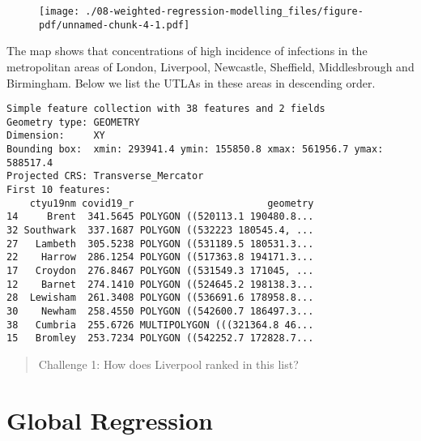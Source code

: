 \documentclass[
  letterpaper,
  krantz2]{style/krantz}
\newenvironment{Shaded}{\begin{snugshade}}{\end{snugshade}}
\newcommand{\DecValTok}[1]{\textcolor[rgb]{0.68,0.00,0.00}{#1}}
\newcommand{\FunctionTok}[1]{\textcolor[rgb]{0.28,0.35,0.67}{#1}}
\newcommand{\NormalTok}[1]{\textcolor[rgb]{0.00,0.23,0.31}{#1}}
\newcommand{\OtherTok}[1]{\textcolor[rgb]{0.00,0.23,0.31}{#1}}
\newcommand{\SpecialCharTok}[1]{\textcolor[rgb]{0.37,0.37,0.37}{#1}}
\begin{document}
\begin{figure}[H]

{\centering \texttt{[image: ./08-weighted-regression-modelling\_files/figure-pdf/unnamed-chunk-4-1.pdf]}

}

\end{figure}

The map shows that concentrations of high incidence of infections in the
metropolitan areas of London, Liverpool, Newcastle, Sheffield,
Middlesbrough and Birmingham. Below we list the UTLAs in these areas in
descending order.

\begin{Shaded}
\end{Shaded}

\begin{verbatim}
Simple feature collection with 38 features and 2 fields
Geometry type: GEOMETRY
Dimension:     XY
Bounding box:  xmin: 293941.4 ymin: 155850.8 xmax: 561956.7 ymax: 588517.4
Projected CRS: Transverse_Mercator
First 10 features:
    ctyu19nm covid19_r                       geometry
14     Brent  341.5645 POLYGON ((520113.1 190480.8...
32 Southwark  337.1687 POLYGON ((532223 180545.4, ...
27   Lambeth  305.5238 POLYGON ((531189.5 180531.3...
22    Harrow  286.1254 POLYGON ((517363.8 194171.3...
17   Croydon  276.8467 POLYGON ((531549.3 171045, ...
12    Barnet  274.1410 POLYGON ((524645.2 198138.3...
28  Lewisham  261.3408 POLYGON ((536691.6 178958.8...
30    Newham  258.4550 POLYGON ((542600.7 186497.3...
38   Cumbria  255.6726 MULTIPOLYGON (((321364.8 46...
15   Bromley  253.7234 POLYGON ((542252.7 172828.7...
\end{verbatim}

\begin{quote}
Challenge 1: How does Liverpool ranked in this list?
\end{quote}

\hypertarget{global-regression}{%
\section{Global Regression}\label{global-regression}}
\end{document}
